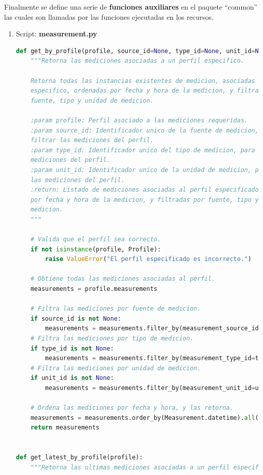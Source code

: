 \documentclass[a4paper,12pt]{article}
\begin{document}
Finalmente se define una serie de \textbf{funciones auxiliares} en el paquete ``common'' las cuales son llamadas por las funciones ejecutadas en los recursos.

\begin{enumerate}

\item Script: \textbf{measurement.py}

\begin{lstlisting}[language=Python]
def get_by_profile(profile, source_id=None, type_id=None, unit_id=None):
    """Retorna las mediciones asociadas a un perfil especifico.

    Retorna todas las instancias existentes de medicion, asociadas a un perfil
    especifico, ordenadas por fecha y hora de la medicion, y filtradas por
    fuente, tipo y unidad de medicion.

    :param profile: Perfil asociado a las mediciones requeridas.
    :param source_id: Identificador unico de la fuente de medicion, para
    filtrar las mediciones del perfil.
    :param type_id: Identificador unico del tipo de medicion, para filtrar las
    mediciones del perfil.
    :param unit_id: Identificador unico de la unidad de medicion, para filtrar
    las mediciones del perfil.
    :return: Listado de mediciones asociadas al perfil especificado, ordenado
    por fecha y hora de la medicion, y filtradas por fuente, tipo y unidad de
    medicion.
    """

    # Valida que el perfil sea correcto.
    if not isinstance(profile, Profile):
        raise ValueError("El perfil especificado es incorrecto.")

    # Obtiene todas las mediciones asociadas al perfil.
    measurements = profile.measurements

    # Filtra las mediciones por fuente de medicion.
    if source_id is not None:
        measurements = measurements.filter_by(measurement_source_id=source_id)
    # Filtra las mediciones por tipo de medicion.
    if type_id is not None:
        measurements = measurements.filter_by(measurement_type_id=type_id)
    # Filtra las mediciones por unidad de medicion.
    if unit_id is not None:
        measurements = measurements.filter_by(measurement_unit_id=unit_id)

    # Ordena las mediciones por fecha y hora, y las retorna.
    measurements = measurements.order_by(Measurement.datetime).all()
    return measurements


def get_latest_by_profile(profile):
    """Retorna las ultimas mediciones asociadas a un perfil especifico.


\end{lstlisting}
\end{enumerate}
\end{document}
